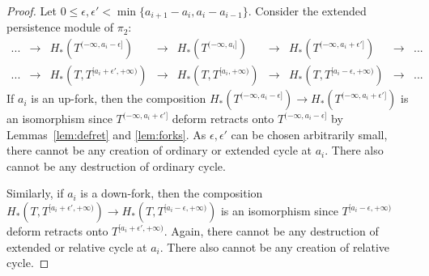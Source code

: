 \begin{proof}
Let $0\leq \epsilon,\epsilon' < \min\{a_{i+1}-a_i,a_i-a_{i-1}\}$. Consider the extended persistence module of $\pi_2$:
%
\[
\begin{array}{lllllllll}
... & \longrightarrow & H_*\left(T^{(-\infty,a_i-\epsilon]}\right) & \longrightarrow & H_*\left(T^{(-\infty,a_i]}\right) & \longrightarrow & H_*\left(T^{(-\infty,a_i+\epsilon']}\right) &\longrightarrow & ... \\[1em]
... & \longrightarrow & H_*\left(T,T^{[a_i+\epsilon',+\infty)}\right) & \longrightarrow & H_*\left(T,T^{[a_i,+\infty)}\right) & \longrightarrow & H_*\left(T,T^{[a_i-\epsilon,+\infty)}\right) & \longrightarrow & ...
\end{array}
\]
%
If $a_i$ is an up-fork, then the composition
$H_*(T^{(-\infty,a_i-\epsilon]}) \to
        H_*(T^{(-\infty,a_i+\epsilon']})$ is an
      isomorphism since $T^{(-\infty,a_i+\epsilon']}$ deform
    retracts onto $T^{(-\infty,a_i-\epsilon]}$ by
      Lemmas~\ref{lem:defret} and \ref{lem:forks}. As
      $\epsilon,\epsilon'$ can be chosen arbitrarily small, there cannot be
      any creation of ordinary or extended cycle at $a_i$. There also
      cannot be any destruction of ordinary cycle.

Similarly, if $a_i$ is a down-fork, then the composition
$H_*(T,T^{[a_i+\epsilon',+\infty)}) \to
  H_*(T,T^{[a_i-\epsilon,+\infty)})$ is an isomorphism
    since $T^{[a_i-\epsilon,+\infty)}$ deform retracts onto
      $T^{[a_i+\epsilon',+\infty)}$. Again, there cannot be any
        destruction of extended or relative cycle at $a_i$. There also
        cannot be any creation of relative cycle.
\end{proof}

